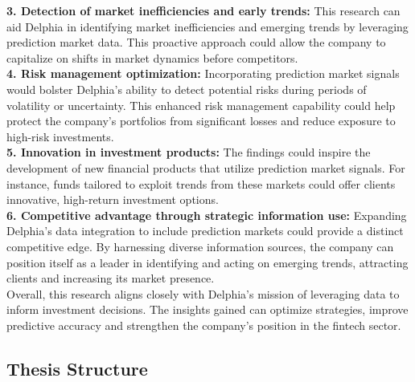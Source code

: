 \documentclass[12pt]{report}
\begin{document}
\textbf{3. Detection of market inefficiencies and early trends:}  
This research can aid Delphia in identifying market inefficiencies and emerging trends by leveraging prediction market data. This proactive approach could allow the company to capitalize on shifts in market dynamics before competitors.\\

\textbf{4. Risk management optimization:}  
Incorporating prediction market signals would bolster Delphia’s ability to detect potential risks during periods of volatility or uncertainty. This enhanced risk management capability could help protect the company’s portfolios from significant losses and reduce exposure to high-risk investments.\\

\textbf{5. Innovation in investment products:}  
The findings could inspire the development of new financial products that utilize prediction market signals. For instance, funds tailored to exploit trends from these markets could offer clients innovative, high-return investment options.\\

\textbf{6. Competitive advantage through strategic information use:}  
Expanding Delphia’s data integration to include prediction markets could provide a distinct competitive edge. By harnessing diverse information sources, the company can position itself as a leader in identifying and acting on emerging trends, attracting clients and increasing its market presence.\\

Overall, this research aligns closely with Delphia’s mission of leveraging data to inform investment decisions. The insights gained can optimize strategies, improve predictive accuracy and strengthen the company’s position in the fintech sector.


\subsection{Thesis Structure}
\end{document}

